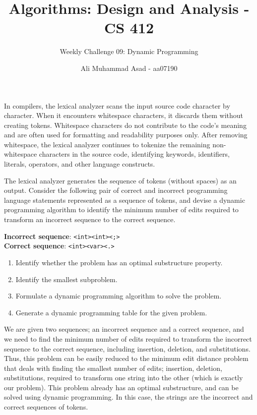 \documentclass[addpoints]{exam}
\title{Algorithms: Design and Analysis - CS 412 \vspace*{-4mm}}
\author{Weekly Challenge 09: Dynamic Programming}
\date{\vspace*{-4mm} Ali Muhammad Asad - aa07190}
\begin{document}
\maketitle

\begin{questions}
    \question[1]
    In compilers, the lexical analyzer scans the input source code character by character. When it encounters whitespace characters, it discards them without creating tokens. Whitespace characters do not contribute to the code's meaning and are often used for formatting and readability purposes only. After removing whitespace, the lexical analyzer continues to tokenize the remaining non-whitespace characters in the source code, identifying keywords, identifiers, literals, operators, and other language constructs.
    
    The lexical analyzer generates the sequence of tokens (without spaces) as an output. Consider the following pair of correct and incorrect programming language statements represented as a sequence of tokens, and devise a dynamic programming algorithm to identify the minimum number of edits required to transform an incorrect sequence to the correct sequence.
    
    \textbf{Incorrect sequence}: \lstinline{<int><int><;>}\\
    \textbf{Correct sequence}: \lstinline{<int><var><.>}
    
    \begin{enumerate}
        \item Identify whether the problem has an optimal substructure property.
        \item Identify the smallest subproblem.
        \item Formulate a dynamic programming algorithm to solve the problem.
        \item Generate a dynamic programming table for the given problem.
    \end{enumerate}
    \begin{solution}
      We are given two sequences; an incorrect sequence and a correct sequence, and we need to find the minimum number of edits required to transform the incorrect sequence to the correct sequence, including insertion, deletion, and substitutions. Thus, this problem can be easily reduced to the minimum edit distance problem that deals with finding the smallest number of edits; insertion, deletion, substitutions, required to transform one string into the other (which is exactly our problem). This problem already has an optimal substructure, and can be solved using dynamic programming. In this case, the strings are the incorrect and correct sequences of tokens.


\end{solution}
\end{questions}
\end{document}
